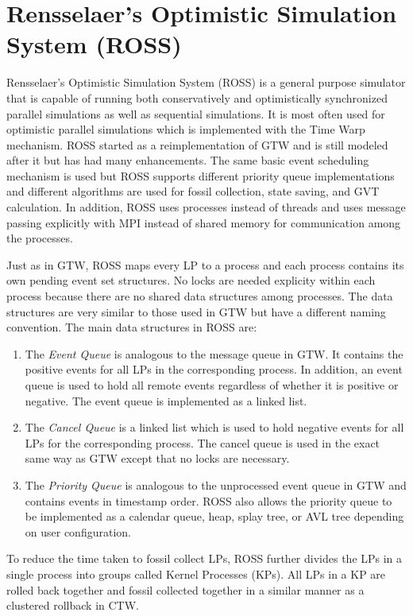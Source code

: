 \documentclass[11pt]{book}
\begin{document}
\section{Rensselaer's Optimistic Simulation System (ROSS)}

Rensselaer's Optimistic Simulation System \cite{carothers-00} (ROSS) is a general purpose
simulator that is capable of running both conservatively and optimistically synchronized
parallel simulations as well as sequential simulations.  It is most often used for
optimistic parallel simulations which is implemented with the Time Warp mechanism.  ROSS
started as a reimplementation of GTW and is still modeled after it but has had many
enhancements.  The same basic event scheduling mechanism is used but ROSS supports
different priority queue implementations and different algorithms are used for fossil
collection, state saving, and GVT calculation.  In addition, ROSS uses processes instead
of threads and uses message passing explicitly with MPI instead of shared memory for
communication among the processes.

Just as in GTW, ROSS maps every LP to a process and each process contains its own pending
event set structures.  No locks are needed explicity within each process because there are
no shared data structures among processes.  The data structures are very similar to those
used in GTW but have a different naming convention.  The main data structures in ROSS are:

\begin{enumerate}
\item The \emph{Event Queue} is analogous to the message queue in GTW.  It contains the
  positive events for all LPs in the corresponding process.  In addition, an event queue
  is used to hold all remote events regardless of whether it is positive or negative.  The
  event queue is implemented as a linked list.
\item The \emph{Cancel Queue} is a linked list which is used to hold negative events for
  all LPs for the corresponding process.  The cancel queue is used in the exact same way
  as GTW except that no locks are necessary.
\item The \emph{Priority Queue} is analogous to the unprocessed event queue in GTW and
  contains events in timestamp order.  ROSS also allows the priority queue to be
  implemented as a calendar queue, heap, splay tree, or AVL tree depending on user
  configuration.
\end{enumerate}

To reduce the time taken to fossil collect LPs, ROSS further divides the LPs in a single process
into groups called Kernel Processes (KPs).  All LPs in a KP are rolled back together and fossil
collected together in a similar manner as a clustered rollback in CTW.
\end{document}

